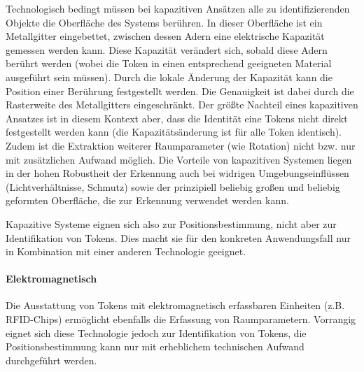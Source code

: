 Technologisch bedingt müssen bei kapazitiven Ansätzen alle zu identifizierenden Objekte die Oberfläche des Systems berühren. In dieser Oberfläche ist ein Metallgitter eingebettet, zwischen dessen Adern eine elektrische Kapazität gemessen werden kann. Diese Kapazität verändert sich, sobald diese Adern berührt werden (wobei die Token in einen entsprechend geeigneten Material ausgeführt sein müssen). Durch die lokale Änderung der Kapazität kann die Position einer Berührung festgestellt werden. Die Genauigkeit ist dabei durch die Rasterweite des Metallgitters eingeschränkt. Der größte Nachteil eines kapazitiven Ansatzes ist in diesem Kontext aber, dass die Identität eine Tokens nicht direkt festgestellt werden kann (die Kapazitätsänderung ist für alle Token identisch). Zudem ist die Extraktion weiterer Raumparameter (wie Rotation) nicht bzw. nur mit zusätzlichen Aufwand möglich. Die Vorteile von kapazitiven Systemen liegen in der hohen Robustheit der Erkennung auch bei widrigen Umgebungseinflüssen (Lichtverhältnisse, Schmutz) sowie der prinzipiell beliebig großen und beliebig geformten Oberfläche, die zur Erkennung verwendet werden kann.

Kapazitive Systeme eignen sich also zur Positionsbestimmung, nicht aber zur Identifikation von Tokens. Dies macht sie für den konkreten Anwendungsfall nur in Kombination mit einer anderen Technologie geeignet. 


\paragraph{Elektromagnetisch} %
\label{par:elektromagnetisch}
 
Die Ausstattung von Tokens mit elektromagnetisch erfassbaren Einheiten (z.B. RFID-Chips) ermöglicht ebenfalls die Erfassung von Raumparametern. Vorrangig eignet sich diese Technologie jedoch zur Identifikation von Tokens, die Positionsbestimmung kann nur mit erheblichem technischen Aufwand durchgeführt werden.

